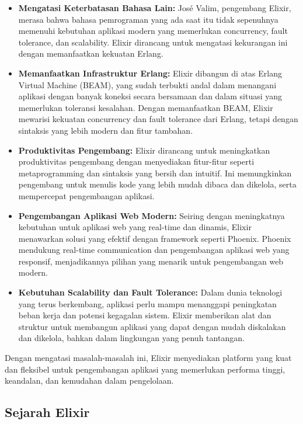 \begin{itemize}
	\item \textbf{Mengatasi Keterbatasan Bahasa Lain:} José Valim, pengembang Elixir, merasa bahwa bahasa pemrograman yang ada saat itu tidak sepenuhnya memenuhi kebutuhan aplikasi modern yang memerlukan concurrency, fault tolerance, dan scalability. Elixir dirancang untuk mengatasi kekurangan ini dengan memanfaatkan kekuatan Erlang.
	
	\item \textbf{Memanfaatkan Infrastruktur Erlang:} Elixir dibangun di atas Erlang Virtual Machine (BEAM), yang sudah terbukti andal dalam menangani aplikasi dengan banyak koneksi secara bersamaan dan dalam situasi yang memerlukan toleransi kesalahan. Dengan memanfaatkan BEAM, Elixir mewarisi kekuatan concurrency dan fault tolerance dari Erlang, tetapi dengan sintaksis yang lebih modern dan fitur tambahan.
	
	\item \textbf{Produktivitas Pengembang:} Elixir dirancang untuk meningkatkan produktivitas pengembang dengan menyediakan fitur-fitur seperti metaprogramming dan sintaksis yang bersih dan intuitif. Ini memungkinkan pengembang untuk menulis kode yang lebih mudah dibaca dan dikelola, serta mempercepat pengembangan aplikasi.
	
	\item \textbf{Pengembangan Aplikasi Web Modern:} Seiring dengan meningkatnya kebutuhan untuk aplikasi web yang real-time dan dinamis, Elixir menawarkan solusi yang efektif dengan framework seperti Phoenix. Phoenix mendukung real-time communication dan pengembangan aplikasi web yang responsif, menjadikannya pilihan yang menarik untuk pengembangan web modern.
	
	\item \textbf{Kebutuhan Scalability dan Fault Tolerance:} Dalam dunia teknologi yang terus berkembang, aplikasi perlu mampu menanggapi peningkatan beban kerja dan potensi kegagalan sistem. Elixir memberikan alat dan struktur untuk membangun aplikasi yang dapat dengan mudah diskalakan dan dikelola, bahkan dalam lingkungan yang penuh tantangan.
\end{itemize}

Dengan mengatasi masalah-masalah ini, Elixir menyediakan platform yang kuat dan fleksibel untuk pengembangan aplikasi yang memerlukan performa tinggi, keandalan, dan kemudahan dalam pengelolaan.


\subsection{Sejarah Elixir}


